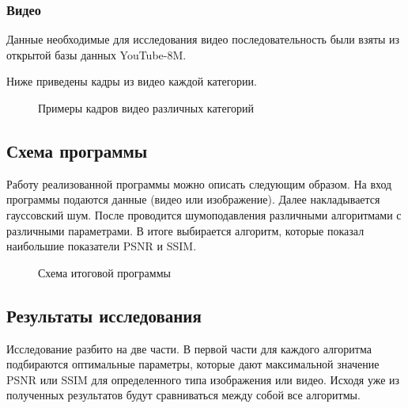 \subsubsection{Видео}
Данные необходимые для исследования видео последовательность были взяты из открытой базы данных  YouTube-8M\cite{youtube8m}.


Ниже приведены кадры из видео каждой категории.
\begin{figure}[H]
	\begin{minipage}[H]{0.49\linewidth}
	\end{minipage}
	\begin{minipage}[H]{0.49\linewidth}
	\end{minipage}
\begin{center}
		\begin{minipage}[H]{0.49\linewidth}
		\end{minipage}
\end{center}
	\caption{Примеры кадров видео различных категорий}
\end{figure}
\subsection{Схема программы}
Работу реализованной программы можно описать следующим образом. На вход программы подаются данные (видео или изображение). Далее накладывается гауссовский шум. После проводится шумоподавления различными алгоритмами с различными параметрами. В итоге выбирается алгоритм, которые показал наибольшие показатели PSNR и SSIM. 
\begin{figure}[H]
	\caption{Схема итоговой программы}
\end{figure}
\subsection{Результаты исследования}
Исследование разбито на две части. В первой части для каждого алгоритма подбираются оптимальные параметры, которые дают максимальной значение PSNR или SSIM для определенного типа изображения или видео. Исходя уже из полученных результатов будут сравниваться между собой все алгоритмы.

